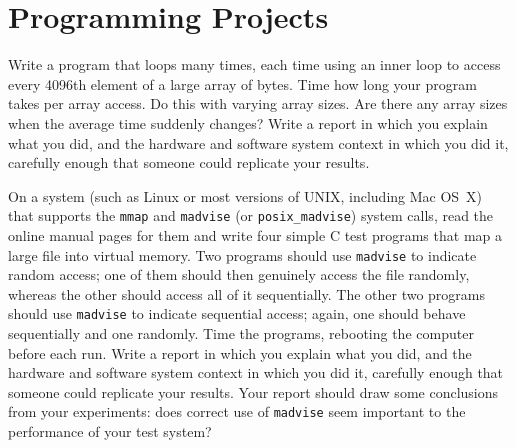 \section*{Programming Projects}
\begin{chapterEnumerate}
\item
Write a program that loops many times, each time using an inner loop
to access every 4096th element of a large array of bytes.  Time how
long your program takes per array access.  Do this with varying array
sizes.  Are there any array sizes when the average time suddenly
changes?  Write a report in which you explain what you did, and the
hardware and software system context in which you did it, carefully
enough that someone could replicate your results.
\item\label{madvise-project}
On a system (such as Linux or most versions of UNIX, including Mac
OS~X) that supports the
\verb|mmap| and \verb|madvise| (or \verb|posix_madvise|) system calls,
read the online manual pages for them and write four simple C test
programs that map a large file into virtual memory.  Two programs
should use \verb|madvise| to indicate random access; one of them
should then genuinely access the file randomly, whereas the other
should access all of it sequentially.  The other two programs should
use \verb|madvise| to indicate sequential access; again, one should
behave sequentially and one randomly.  Time the programs, rebooting
the computer before each run.  Write a report in which you explain
what you did, and the hardware and software system context in which
you did it, carefully enough that someone could replicate your
results.  Your report should draw some conclusions from your
experiments: does correct use of \verb|madvise| seem important to the
performance of your test system?
\end{chapterEnumerate}

